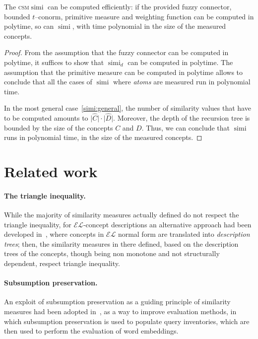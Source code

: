 \documentclass[]{llncs}
\DeclareMathOperator{\simi}{simi}
\newcommand{\el}{\(\mathcal{EL}\)\xspace}
\newcommand{\csm}{\textsc{csm}\xspace}
\begin{document}
  \begin{proposition}
    The \csm \(\simi\) can be computed efficiently: if the provided fuzzy connector, bounded \(t\)--conorm, primitive measure and weighting function can be computed in polytime, so can \(\simi\), with time polynomial in the size of the measured concepts.
  \end{proposition}
  \begin{proof}
    From the assumption that the fuzzy connector can be computed in polytime, it suffices to show that \(\simi_d\) can be computed in polytime.
    The assumption that the primitive measure can be computed in polytime allows to conclude that all the cases of \(\simi\) where \emph{atoms} are measured run in polynomial time.

    In the most general case~\eqref{simi:general}, the number of similarity values that have to be computed amounts to \(\lvert \widehat{C} \rvert \cdot \lvert \widehat{D} \rvert\).
    Moreover, the depth of the recursion tree is bounded by the size of the concepts \(C\) and \(D\).
    Thus, we can conclude that \(\simi\) runs in polynomial time, in the size of the measured concepts.
  \end{proof}

  \section{Related work}

  \paragraph{The triangle inequality.} While the majority of similarity measures actually defined do not respect the triangle inequality, for \el-concept descriptions an alternative approach had been developed in~\cite{DAB14}, where concepts in \el normal form are translated into \emph{description trees}; then, the similarity measures in there defined, based on the description trees of the concepts, though being non monotone and not structurally dependent, respect triangle inequality.

  \paragraph{Subsumption preservation.} An exploit of subsumption preservation as a guiding principle of similarity measures had been adopted in~\cite{Se16},
  as a way to improve evaluation methods, in which subsumption preservation is used to populate query inventories, which are then used to perform the evaluation of word embeddings.
\end{document}
